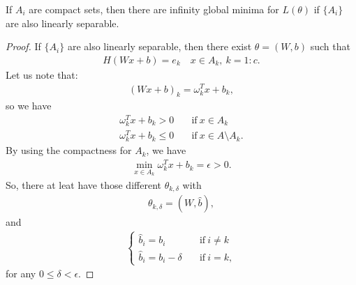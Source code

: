 \begin{theorem}\label{theo:linearinfinity}
If $A_i$ are compact sets, then 
there are infinity global minima for $L(\theta)$ if $\{A_i\}$ are also linearly separable.
\end{theorem}
\begin{proof}If $\{A_i\}$ are also linearly separable, then there exist $\theta=(W,b)$ such that
\begin{align}
H(Wx + b) = e_k \quad x \in A_k, ~ k =1:c.
\end{align}
Let us note that:
\begin{align}
(Wx + b)_k = \omega_k^T x + b_k,
\end{align}
so we have
\begin{align}
\omega_k^T x + b_k > 0 \quad &\text{if}~ x \in A_k \\
\omega_k^T x + b_k \le 0 \quad &\text{if}~ x \in A \setminus A_k.
\end{align}
By using the compactness for $A_k$, we have 
\begin{align}
\min_{x\in A_k} \omega_k^T x + b_k = \epsilon > 0.
\end{align}
So, there at leat have those different $\theta_{k,\delta}$ with 
\begin{align}
\theta_{k,\delta} = (W, \hat{b}), 
\end{align}
and 
\begin{align}
\begin{cases}
\hat{b}_i = b_i \quad &\text{if}~ i \neq k \\
\hat{b}_i = b_i - \delta \quad &\text{if}~ i = k,
\end{cases}
\end{align}
for any $0 \le \delta < \epsilon$.


\end{proof}
